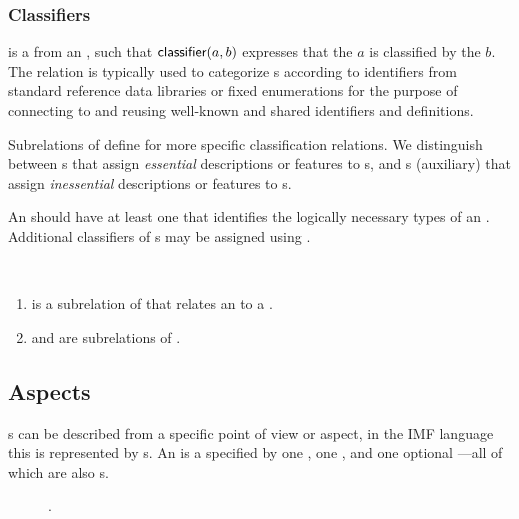 \subsubsection{Classifiers}
\label{sec:classifiers}

 is a  from an ,
such that $\textsf{classifier}(a,b)$ expresses that
the  $a$ is classified by the  $b$.
%
The relation is typically used to categorize s according to
identifiers from standard reference data libraries or fixed
enumerations for the purpose of connecting to and reusing well-known and shared
identifiers and definitions.

Subrelations of 
define for more specific classification relations.
We distinguish between
s that assign \emph{essential} descriptions or features to s, and
s (auxiliary) that assign \emph{inessential} descriptions or features to s.

An  should have at least one  that
identifies the logically necessary types of an .
%
Additional classifiers of s may be assigned using
.

\begin{axioms}~
  \begin{enumerate}[resume=axioms,{label=(\arabic*)}]
  \item {} is a subrelation of  that relates an  to a .
  \item {} and  are subrelations of
    .
  \end{enumerate}
\end{axioms}



\subsection{Aspects}
\label{sec:aspect}

s can be described from a specific point of view or
aspect, in the IMF language this is represented by s.
%
An  is a  specified by
one ,
one ,
and one optional ---all of which are also s.



\begin{figure}
\centering

\caption{\label{uml-aspect}
.}
\end{figure}


